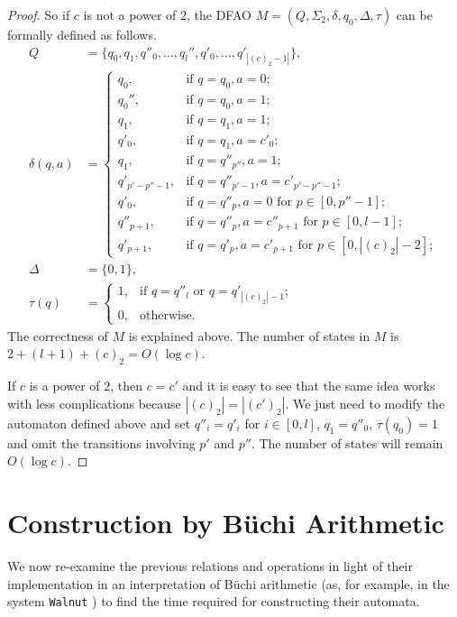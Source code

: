 \documentclass[12pt,reqno]{article}
\begin{document}
\begin{proof}
    So if $c$ is not a power of $2$, the DFAO $M=(Q, \Sigma_2, \delta, q_0, \Delta, \tau)$ can be formally defined as follows.
\begin{align*}
    Q &= \{q_0, q_1, q''_0, \ldots, q_l'', q'_0, \ldots, q'_{|(c)_2-1|}  \},\\
    \delta(q, a) &=
    \begin{cases}
        q_0, & \text{if $q=q_0, a=0$}; \\
        q_0'', & \text{if $q=q_0, a=1$}; \\
        q_1, & \text{if $q=q_1, a=1$}; \\
        q'_0, & \text{if $q=q_1, a=c'_0$}; \\
        q_1, & \text{if $q=q''_{p''}, a=1$}; \\
        q'_{p'-p''-1}, & \text{if $q=q''_{p'-1}, a=c'_{p'-p''-1}$}; \\
        q'_0, & \text{if $q=q''_p, a = 0$ for  $p \in [0, p''-1]$}; \\
        q''_{p+1}, & \text{if $q=q''_p, a = c''_{p+1}$ for  $p \in [0, l-1]$}; \\
        q'_{p+1}, & \text{if $q=q'_p, a = c'_{p+1}$ for  $p \in [0, |(c)_2|-2]$};
    \end{cases} \\
        \Delta &= \{0, 1\} , \\
            \tau(q) &= 
    \begin{cases}
        1, & \text{if $q=q''_l$ or $q=q'_{|(c)_2|-1}$}; \\
        0, & \text{otherwise}.
    \end{cases}
\end{align*}
The correctness of $M$ is explained above. The number of states in $M$ is  $2+ (l+1) + (c)_2 =O(\log c)$.

If $c$ is a power of $2$, then $c=c'$ and it is easy to see that the same idea works with less complications because $|(c)_2|=|(c')_2|$.
We just need to modify the automaton defined above and set $q''_i = q'_i$ for $i \in [0, l]$, $q_1 = q''_0$, $\tau(q_0)=1$ and omit the transitions involving $p'$ and $p''$. The number of states will remain $O(\log c)$.
\end{proof}


\section{Construction by B\"uchi Arithmetic} \label{section:Buchi} 

We now re-examine the previous relations and operations in light of their implementation in an interpretation of B\"uchi arithmetic (as, for example, in
the system \texttt{Walnut} \cite{mousavi_automatic_2021}) to find the time required for constructing their automata.  
\end{document}
